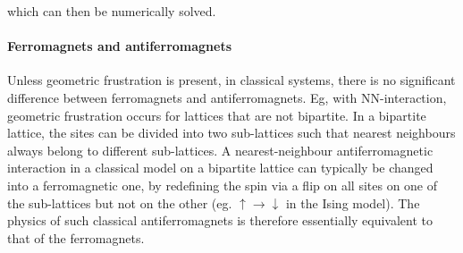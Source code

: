 \documentclass{homework}
\begin{document}
which can then be numerically solved. 

\clearpage 




    

%

\clearpage 


\paragraph{\textbf{Ferromagnets and antiferromagnets}}

Unless geometric frustration is present, in classical systems, there is no significant difference between ferromagnets and antiferromagnets. Eg, with NN-interaction, geometric frustration occurs for lattices that are not bipartite. In a bipartite lattice, the sites can be divided into two sub-lattices such that nearest neighbours always belong to different sub-lattices. A nearest-neighbour antiferromagnetic interaction in a classical model on a bipartite lattice can typically be changed into a ferromagnetic one, by redefining the spin via a flip on all sites on one of the sub-lattices but not on the other (eg. $\uparrow \rightarrow \downarrow$ in the Ising model). The physics of such classical antiferromagnets is therefore essentially equivalent to that of the ferromagnets. \\
\end{document}
